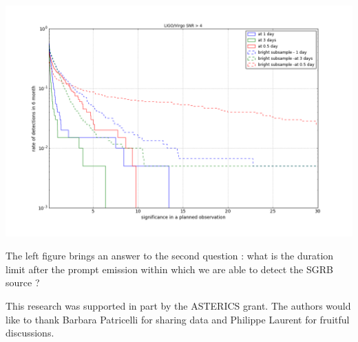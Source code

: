 \documentclass[a0,portrait]{a0poster}
\begin{document}
\begin{multicols}{2}
\begin{center}\vspace{.5cm}
  \includegraphics[width=20cm]{figures/significance_vs_rate_af.png}
    \label{covered_region}
\end{center}

The left figure brings an answer to the second question : what is the duration
limit after the prompt emission within which we are able to detect the SGRB
source ?





\vspace{10mm}

{\footnotesize 
  This research was supported in part by the ASTERICS grant. The authors would like to thank Barbara Patricelli for sharing data and Philippe Laurent for fruitful discussions. }


\end{multicols}
\end{document}
